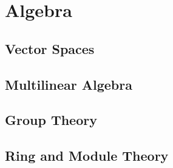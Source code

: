 

\part{Algebra}

\chapter{Vector Spaces}










\chapter{Multilinear Algebra}







\chapter{Group Theory}






\chapter{Ring and Module Theory}






% 
% 
% 
% 
% 

